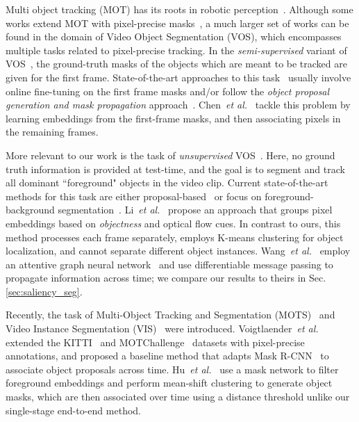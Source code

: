 \documentclass[runningheads]{llncs}
\makeatletter
\newcommand*{\etal}{\emph{et al.}\@\xspace}
\newcommand{\refsec}[1]{Sec.\,\ref{sec:#1}}
\newcommand{\PAR}[1]{\vskip4pt \noindent {\bf #1~}}
\makeatother
\begin{document}
\PAR{Pixel-precise Tracking of Multiple Objects:}
Multi object tracking (MOT) has its roots in robotic perception~\cite{JainNagel79TPAMI,Paragios00TPAMI,Teichman11ICRA,Wren97TPAMI}. 
Although some works extend MOT with pixel-precise masks~\cite{Milan15CVPR,Osep18ICRA}, a much larger set of works can be found in the domain of Video Object Segmentation (VOS), which encompasses multiple tasks related to pixel-precise tracking. In the \textit{semi-supervised} variant of VOS~\cite{Caelles18arXiv}, the ground-truth masks of the objects which are meant to be tracked are given for the first frame. 
State-of-the-art approaches to this task~\cite{Caelles17CVPR,Ting17NIPS,Oh2019ICCV,Tokmakov17ICCV,Ventura19CVPR,Voigtlaender19CVPRFeelVOS,Wug18CVPR,Xu18ECCV,Yang18CVPR,Zeng19ICCV} usually involve online fine-tuning on the first frame masks and/or 
follow the \textit{object proposal generation and mask propagation} approach~\cite{Luiten18ACCV,Zeng19ICCV}.
Chen~\etal~\cite{Chen2018CVPR} tackle this problem by learning embeddings from the first-frame masks, and then associating pixels in the remaining frames. 

More relevant to our work is the task of \textit{unsupervised} VOS~\cite{Caelles19arXiv,Perazzi16CVPR}. 
Here, no ground truth information is provided at test-time, and the goal is to segment and track all dominant ``foreground" objects in the video clip. 
Current state-of-the-art methods for this task are either proposal-based~\cite{Zeng19ICCV,Zulfikar19CVPRW} or focus on foreground-background segmentation~\cite{Hou19BMVC,Jain17CVPR,SiamICRA2019,Song18ECCV,Tokmakov17ICCV,Ventura19CVPR,Yang19ICCVAnchorDiff,Koh17CVPR}. Li~\etal~\cite{Li18CVPR} propose an approach that groups pixel embeddings based on \textit{objectness} and optical flow cues. 
In contrast to ours, this method processes each frame separately, employs K-means clustering for object localization, and cannot separate different object instances. 
Wang~\etal~\cite{Wang19ICCV} employ an attentive graph neural network~\cite{Gori05IJCNN} and use differentiable message passing to propagate information across time; we compare our results to theirs in \refsec{saliency_seg}.

Recently, the task of Multi-Object Tracking and Segmentation (MOTS)~\cite{Voigtlaender19CVPR} and Video Instance Segmentation (VIS)~\cite{Yang19ICCV} were introduced. 
Voigtlaender~\etal~\cite{Voigtlaender19CVPR} extended the KITTI~\cite{Geiger12CVPR} and MOTChallenge~\cite{LealTaixe15arxiv,Milan16arxiv} datasets with pixel-precise annotations, and proposed a baseline method that adapts Mask R-CNN~\cite{He17ICCV} to associate object proposals across time. Hu~\etal~\cite{Hu19Arxiv} use a mask network to filter foreground embeddings and perform mean-shift clustering to generate object masks, which are then associated over time using a distance threshold unlike our single-stage end-to-end method. 
\end{document}
